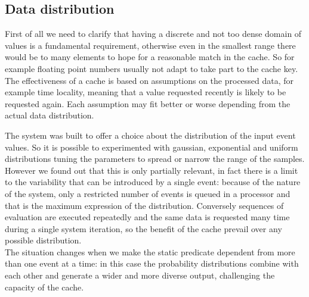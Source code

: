 \subsection{Data distribution}
First of all we need to clarify that having a discrete and not too dense domain of values is a fundamental requirement, otherwise even in the smallest range there would be to many elements to hope for a reasonable match in the cache. So for example floating point numbers usually not adapt to take part to the cache key.\\
The effectiveness of a cache is based on assumptions on the processed data, for example time locality, meaning that a value requested recently is likely to be requested again. Each assumption may fit better or worse depending from the actual data distribution.

The system was built to offer a choice about the distribution of the input event values. So it is possible to experimented with gaussian, exponential and uniform distributions tuning the parameters to spread or narrow the range of the samples.\\
However we found out that this is only partially relevant, in fact there is a limit to the variability that can be introduced by a single event: because of the nature of the system, only a restricted number of events is queued in a processor and that is the maximum expression of the distribution. Conversely sequences of evaluation are executed repeatedly and the same data is requested many time during a single system iteration, so the benefit of the cache prevail over any possible distribution.\\
The situation changes when we make the static predicate dependent from more than one event at a time: in this case the probability distributions combine with each other and generate a wider and more diverse output, challenging the capacity of the cache.

